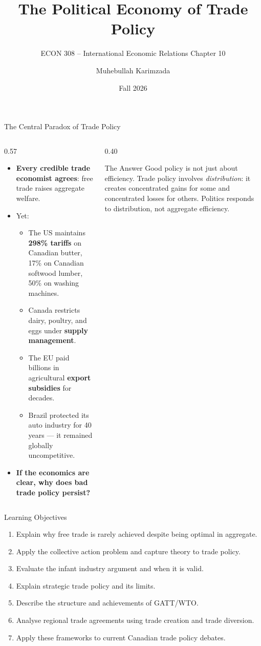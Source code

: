 \documentclass[aspectratio=169]{beamer}
\title{\textbf{The Political Economy of Trade Policy}}
\subtitle{{\large ECON 308 -- International Economic Relations \quad Chapter 10}}
\author{Muhebullah Karimzada}
\institute{School of Economics \\ University of Northern British Columbia}
\date{Fall 2026}
\begin{document}
\begin{frame}[plain]\titlepage\end{frame}

\begin{frame}{The Central Paradox of Trade Policy}
\begin{columns}
\begin{column}{0.57\textwidth}
\begin{itemize}
  \item \textbf{Every credible trade economist agrees}: free trade raises aggregate welfare.
  \item Yet:
    \begin{itemize}
      \item The US maintains \textbf{298\% tariffs} on Canadian butter, 17\% on Canadian softwood lumber, 50\% on washing machines.
      \item Canada restricts dairy, poultry, and eggs under \textbf{supply management}.
      \item The EU paid billions in agricultural \textbf{export subsidies} for decades.
      \item Brazil protected its auto industry for 40 years --- it remained globally uncompetitive.
    \end{itemize}
  \item \textbf{If the economics are clear, why does bad trade policy persist?}
\end{itemize}
\end{column}
\begin{column}{0.40\textwidth}
\begin{insight}{The Answer}
  Good policy is not just about efficiency. Trade policy involves \emph{distribution}: it creates concentrated gains for some and concentrated losses for others. Politics responds to distribution, not aggregate efficiency.
\end{insight}
\end{column}
\end{columns}
\end{frame}

\begin{frame}{Learning Objectives}
\begin{enumerate}
  \item Explain why free trade is rarely achieved despite being optimal in aggregate.
  \item Apply the collective action problem and capture theory to trade policy.
  \item Evaluate the infant industry argument and when it is valid.
  \item Explain strategic trade policy and its limits.
  \item Describe the structure and achievements of GATT/WTO.
  \item Analyse regional trade agreements using trade creation and trade diversion.
  \item Apply these frameworks to current Canadian trade policy debates.
\end{enumerate}
\end{frame}
\end{document}
